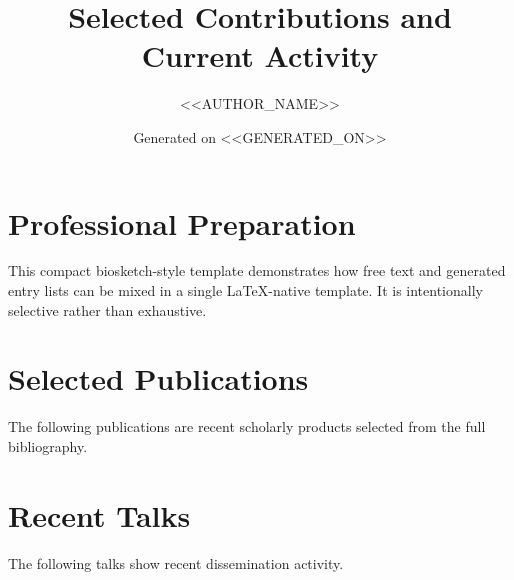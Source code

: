 \documentclass[11pt]{article}
\title{Selected Contributions and Current Activity}
\author{<<AUTHOR_NAME>>}
\date{Generated on <<GENERATED_ON>>}
\begin{document}
\maketitle

\section*{Professional Preparation}
This compact biosketch-style template demonstrates how free text and generated entry lists can be mixed in a single LaTeX-native template. It is intentionally selective rather than exhaustive.

\section*{Selected Publications}
The following publications are recent scholarly products selected from the full bibliography.

\CVList[collection=publications, select=after(2023), sort=year_desc, limit=5, list=enumerate, format="<<author>>, <<year>>: <<title>>, <<journal>>, <<booktitle>>, <<doi>>"]

\section*{Recent Talks}
The following talks show recent dissemination activity.

\CVList[collection=talks, select=after(2024), sort=year_desc, limit=3, list=itemize, format="<<title>>, <<note>>, <<year>>"]
\end{document}
